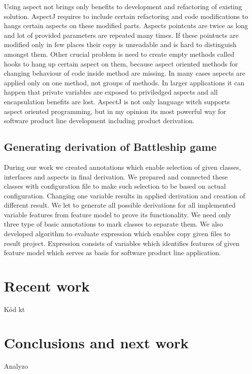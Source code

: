 \documentclass[11pt,slovak,a4paper,twoside]{article}
\begin{document}
Using aspect not brings only benefits to development and refactoring of existing solution. AspectJ requires to include certain refactoring and code modifications to hangs certain aspects on these modified parts. Aspects pointcuts are twice as long and lot of provided parameters are repeated many times. If these pointucts are modified only in few places their copy is unreadable and is hard to distinguish amongst them. Other crucial problem is need to create empty methods called hooks to hang up certain aspect on them, because aspect oriented methods for changing behaviour of code inside method are missing. In many cases aspects are applied only on one method, not groups of methods. In larger applications it can happen that private variables are exposed to priviledged aspects and all encapsulation benefits are lost. AspectJ is not only language witch supports aspect oriented programming, but in my opinion its most powerful way for software product line development including product derivation.


\subsection{Generating derivation of Battleship game} \label{gameDerivationBattleship}

During our work we created annotations which enable selection of given classes, interfaces and aspects in final derivation. We prepared and connected these classes with configuration file to make such selection to be based on actual configuration. Changing one variable results in applied derivation and creation of different result. We let to generate all possible derivations for all implemented variable features from feature model to prove its functionality. We need only three type of basic annotations to mark classes to separate them. We also developed algorithm to evaluate expression which enables copy given files to result project. Expression consists of variables which identifies features of given feature model which serves as basis for software product line application.    


\section{Recent work} \label{recentWork}

Kód kt


\section{Conclusions and next work} \label{conclusions}

Analyzo
 


\end{document}
